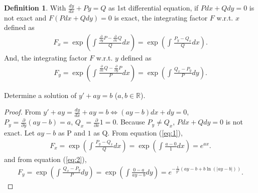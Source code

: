 \documentclass[12pt]{article}
\theoremstyle{definition}
\newtheorem{definition}{Definition}
\newtheorem{corollary}{Corollary}[theorem]
\newtheorem{lemma}[theorem]{Lemma}
\newtheorem{case}{Case}
\newenvironment{problem}[2][Problem]{\begin{trivlist}
    \item[\hskip \labelsep {\bfseries #1}\hskip \labelsep {\bfseries #2.}]}{\end{trivlist}}
\begin{document}
\begin{definition}
    With $\frac{dy}{dx}+Py=Q$ as 1st differential equation, if $Pdx+Qdy=0$ is not exact and $F(Pdx+Qdy)=0$ is exact, the integrating factor $F$ w.r.t. $x$ defined as 
    \begin{align}
        F_{x}=\exp\left(\int_{}^{}\frac{\frac{\partial}{\partial y}P-\frac{\partial}{\partial x}Q}{Q}dx\right)=\exp\left(\int_{}^{}\frac{P_y-Q_x}{Q}dx\right).\label{eq:1}
    \end{align}
    And, the integrating factor $F$ w.r.t. $y$ defined as 
    \begin{align}
        F_{y}=\exp\left(\int_{}^{}\frac{\frac{\partial}{\partial x}Q-\frac{\partial}{\partial y}P}{P}dx\right)=\exp\left(\int_{}^{}\frac{Q_x-P_y}{P}dy\right).\label{eq:2}
    \end{align}    
\end{definition}

\begin{problem}{1}
    Determine a solution of $y'+ay=b$ ($a,b \in \mathbb{R}$).
\end{problem}
\begin{proof}
    From $y'+ay = \frac{dy}{dx}+ay=b \Leftrightarrow (ay-b)dx+dy=0$, $P_{y}=\frac{\partial}{\partial y}(ay-b)=a$, $Q_{x}=\frac{\partial}{\partial x}1=0$. Because $P_{y} \neq Q_{x}$, $Pdx+Qdy=0$ is not exact. Let $ay-b$ as P and $1$ as Q. From equation (\ref{eq:1}),
    \begin{align}
        F_{x} = \exp\left(\int_{}^{}\frac{P_y-Q_x}{Q}dx\right) =\exp\left(\int_{}^{}\frac{a-0}{1}dx\right)=e^{ax}.
    \end{align}
    and from equation (\ref{eq:2}),
    \begin{align}
        F_{y} = \exp\left(\int_{}^{}\frac{Q_x-P_y}{P}dy\right)=\exp\left(\int_{}^{}\frac{0-a}{ay-b}dy\right)=e^{-\frac{1}{y^2}(ay-b+b \ln (|ay-b|))}.
    \end{align}
\end{proof}


    
\end{document}
